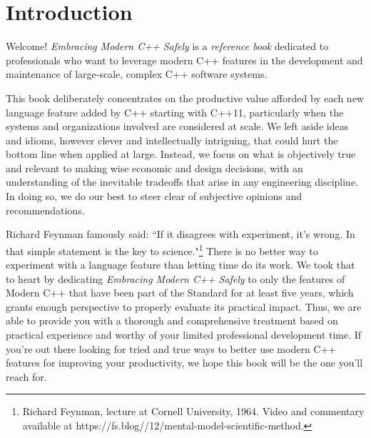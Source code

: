 \setcounter{chapter}{-1}
\chapter[Introduction]{Introduction}\label{ch-intro}

Welcome! \textit{Embracing Modern C++ Safely} is a \textit{reference book} dedicated to professionals who want to leverage modern C++ features in the development and maintenance of large-scale, complex C++ software systems.

This book deliberately concentrates on the productive value afforded by each new language feature added by C++ starting with C++11, particularly when the systems and organizations involved are considered at scale. We left aside ideas and idioms, however clever and intellectually intriguing, that could hurt the bottom line when applied at large. Instead, we focus on what is objectively true and relevant to making wise economic and design decisions, with an understanding of the inevitable tradeoffs that arise in any engineering discipline. In doing so, we do our best to steer clear of subjective opinions and recommendations.

Richard Feynman famously said: ``If it disagrees with experiment, it’s wrong. In that simple statement is the key to science."\footnote{Richard Feynman, lecture at Cornell University, 1964. Video and commentary available at https://\linebreak[3]fs.\linebreak[3]blog//12/mental-model-scientific-method.} There is no better way to experiment with a language feature than letting time do its work. We took that to heart by dedicating \textit{Embracing Modern C++ Safely} to only the features of Modern C++ that have been part of the Standard for at least five years, which grants enough perspective to properly evaluate its practical impact. Thus, we are able to provide you with a thorough and comprehensive treatment based on practical experience and worthy of your limited professional development time. If you're out there looking for tried and true ways to better use modern C++ features for improving your productivity, we hope this book will be the one you'll reach for.

